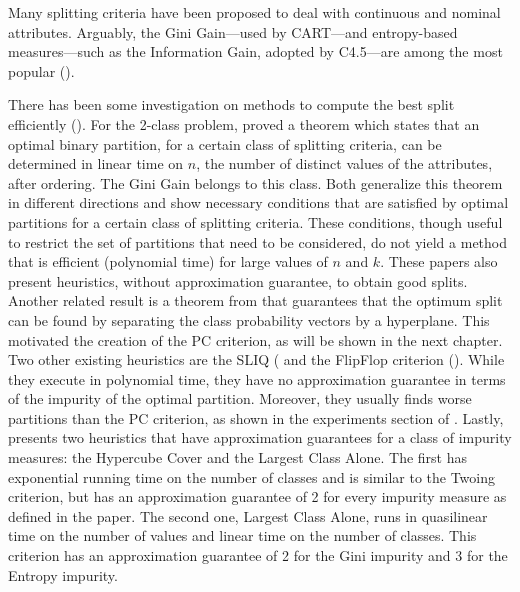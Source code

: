 Many splitting criteria have been proposed to 
deal with continuous and nominal attributes.
Arguably, the Gini Gain---used by CART---and entropy-based measures---such as 
the Information Gain, adopted by C4.5---are among
the most popular (\cite{books/sp/datamining2005/RokachM05,
Loh2014,series/sbcs/BarrosCF15}).

There has been  some investigation on 
methods to compute the best split efficiently 
(\cite{Breiman84,Chou:91,BPKN:92,journals/datamine/CoppersmithHH99}).
For the 2-class problem,  \cite{Breiman84} proved a theorem which states that an optimal
binary partition, for a certain class of splitting criteria,
can be determined in linear time on $n$, the number of distinct values of the attributes, after ordering.
The Gini  Gain belongs to this class.
Both \cite{Chou:91,BPKN:92,journals/datamine/CoppersmithHH99} generalize
this theorem  in different directions 
and show necessary conditions that are satisfied by optimal partitions for a certain class of splitting criteria. 
These conditions, though useful to restrict the set of partitions
that need to be considered, do not yield  a method that
is efficient (polynomial time) for large values of $n$ and $k$. These papers also  present  heuristics, without approximation guarantee, to obtain good splits.
Another related result is a theorem from \cite{journals/datamine/CoppersmithHH99} that guarantees that the optimum split can be found by separating the class probability vectors by a hyperplane. This motivated the creation of the PC criterion, as will be shown in the next chapter. Two other existing heuristics are the SLIQ (\cite{mehta1996sliq} and the FlipFlop criterion (\cite{nadas1991iterative}). While they execute in polynomial time, they have no approximation guarantee in terms of the impurity of the optimal partition. Moreover, they usually finds worse partitions than the PC criterion, as shown in the experiments section of \cite{journals/datamine/CoppersmithHH99}. Lastly, \cite{icml2018} presents two heuristics that have approximation guarantees for a class of impurity measures: the Hypercube Cover and the Largest Class Alone. The first has exponential running time on the number of classes and is similar to the Twoing criterion, but has an approximation guarantee of 2 for every impurity measure as defined in the paper. The second one, Largest Class Alone, runs in quasilinear time on the number of values and linear time on the number of classes. This criterion has an approximation guarantee of 2 for the Gini impurity and 3 for the Entropy impurity. 

